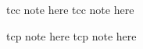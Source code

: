 \documentclass{article}
\begin{document}
\begin{algorithm}[!htp]
\DontPrintSemicolon %

tcc note here
tcc note here

tcp note here
tcp note here

\caption{title}
\end{algorithm}
\end{document}
